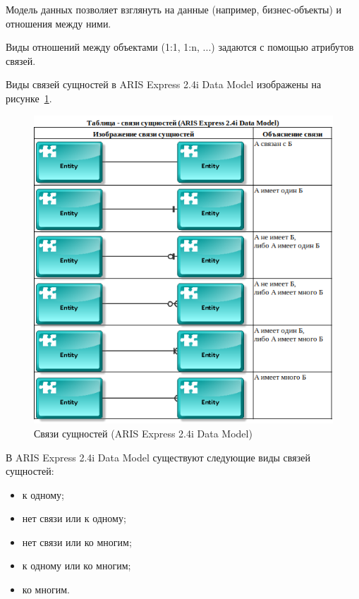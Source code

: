 Модель данных позволяет взглянуть на данные (например, бизнес-объекты) и отношения между ними.

Виды отношений между объектами (1:1, 1:n, ...) задаются с помощью атрибутов связей.

Виды связей сущностей в ARIS Express 2.4i \cite{ArisExpress} Data Model изображены на рисунке~\ref{fig:ArisDataModelRelations}.

\begin{figure}[!h]
    \centering

    \includegraphics[width=16cm]
    {assets/ARIS/DataModel/Relations/ArisDataModelRelations.png}

    \caption{Связи сущностей (ARIS Express 2.4i Data Model)}

    \label{fig:ArisDataModelRelations}
\end{figure}

В ARIS Express 2.4i \cite{ArisExpress} Data Model существуют следующие виды связей сущностей:
\begin{itemize}
    \item к одному;
    \item нет связи или к одному;
    \item нет связи или ко многим;
    \item к одному или ко многим;
    \item ко многим.
\end{itemize}

